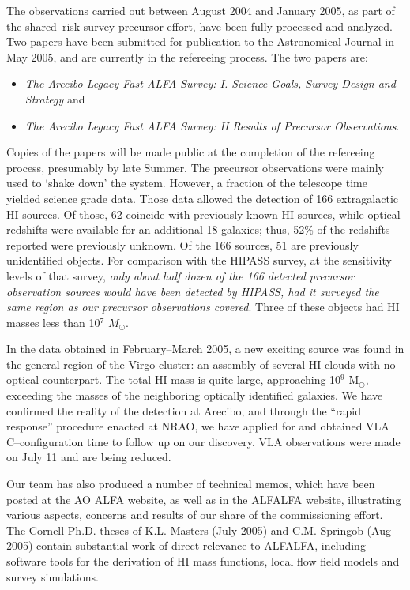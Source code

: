 The observations carried out between August 2004 and January 2005, as part
of the shared--risk survey precursor effort, have been fully processed and
analyzed. Two papers have been submitted for publication to the Astronomical
Journal in May 2005, and are currently in the refereeing process. The two
papers are: 
\begin{itemize}
\item {\it The Arecibo Legacy Fast ALFA Survey: I. Science Goals, 
Survey Design and Strategy} and 
\item {\it The Arecibo Legacy Fast ALFA Survey: 
II Results of Precursor Observations}. 
\end{itemize}
Copies of the papers will be made public at the completion of the refereeing 
process, presumably by late Summer. The precursor observations were mainly
used to `shake down' the system. However, a fraction of the telescope time
yielded science grade data. Those data allowed the detection of 166 
extragalactic HI sources. Of those, 62 coincide with previously known HI sources,
while optical redshifts were available for an additional 18 galaxies; thus, 52\%
of the redshifts reported were previously unknown. Of the 166 sources, 51 are
previously unidentified objects. For comparison with the HIPASS survey,
at the sensitivity levels of that survey, {\it only about half dozen of the
166 detected precursor observation sources would have been detected by HIPASS, 
had it surveyed the same region as our precursor observations covered}.
Three of these objects had HI masses less than 10$^7$ $M_\odot$.

In the data obtained in February--March 2005, a new exciting source was found
in the general region of the Virgo cluster: an assembly of several HI clouds  
with no optical counterpart. The total HI mass is quite large, approaching
10$^9$ M$_\odot$, exceeding the masses of the neighboring optically
identified galaxies. We have confirmed the reality of the detection at
Arecibo, and through the ``rapid response'' procedure enacted at NRAO, we 
have applied for and obtained VLA C--configuration time to follow up on 
our discovery. VLA observations were made on July 11 and are being reduced.

Our team has also produced a number of technical memos, which have been
posted at the AO ALFA website, as well as in the ALFALFA website, illustrating
various aspects, concerns and results of our share of the commissioning effort. 
The Cornell Ph.D. theses of K.L. Masters (July 2005) and C.M. Springob
(Aug 2005) contain substantial work of direct relevance to ALFALFA,
including software tools for the derivation of HI mass functions, local
flow field models and survey simulations.

